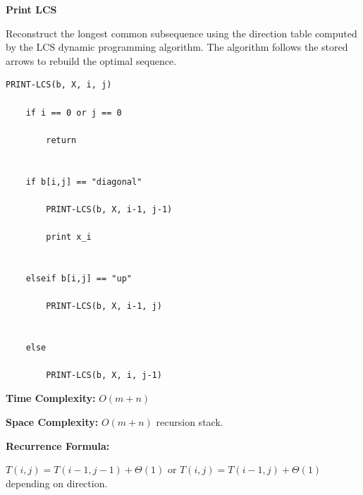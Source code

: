 \documentclass[a4paper,12pt]{article}
\begin{document}
\begin{tcolorbox}[
    colback=gray!30,
    colframe=black,
    boxrule=1pt,
    arc=0mm
]

\begin{tcolorbox}[
    colback=gray!10,
    colframe=black,
    arc=0mm
]
\centering
{\Huge\bfseries Print LCS}
\end{tcolorbox}


\begin{tcolorbox}[
    colback=gray!10,
    colframe=black,
    arc=0mm
]
\small
Reconstruct the longest common subsequence using the direction table
computed by the LCS dynamic programming algorithm.
The algorithm follows the stored arrows to rebuild the optimal sequence.
\end{tcolorbox}


\begin{tcolorbox}[
    colback=black!5,
    colframe=black,
    arc=0mm,
    title=Pseudo-code
]
\tiny
\begin{lstlisting}
PRINT-LCS(b, X, i, j)

    if i == 0 or j == 0

        return


    if b[i,j] == "diagonal"

        PRINT-LCS(b, X, i-1, j-1)

        print x_i


    elseif b[i,j] == "up"

        PRINT-LCS(b, X, i-1, j)


    else

        PRINT-LCS(b, X, i, j-1)
\end{lstlisting}
\end{tcolorbox}


\begin{tcolorbox}[
    colback=cyan!20,
    colframe=black,
    arc=0mm
]
\small
\textbf{Time Complexity:}
$O(m+n)$
\end{tcolorbox}


\begin{tcolorbox}[
    colback=violet!20,
    colframe=black,
    arc=0mm
]
\small
\textbf{Space Complexity:}
$O(m+n)$ recursion stack.
\end{tcolorbox}


\begin{tcolorbox}[
    colback=pink!20,
    colframe=black,
    arc=0mm
]
\small
\textbf{Recurrence Formula:}

$T(i,j)=T(i-1,j-1)+\Theta(1)$  
or $T(i,j)=T(i-1,j)+\Theta(1)$ depending on direction.
\end{tcolorbox}

\end{tcolorbox}
\end{document}
